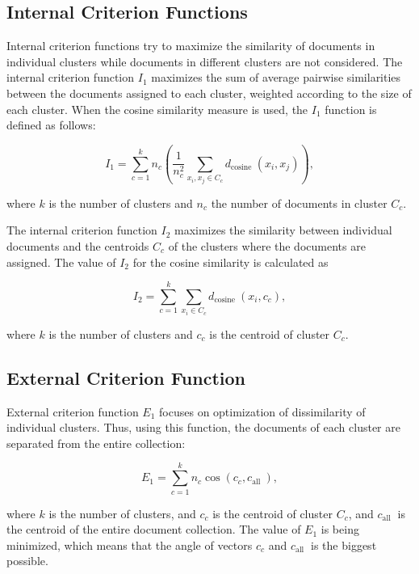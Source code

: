 \subsection{Internal Criterion Functions}
Internal criterion functions try to maximize the similarity of documents in individual clusters while documents in different clusters are not considered. The internal criterion function $I_{1}$ maximizes the sum of average pairwise similarities between the documents assigned to each cluster, weighted according to the size of each cluster. When the cosine similarity measure is used, the $I_{1}$ function is defined as follows:


\begin{equation*}
I_{1}=\sum_{c=1}^{k} n_{c}\left(\frac{1}{n_{c}^{2}} \sum_{x_{i}, x_{j} \in C_{c}} d_{\text {cosine }}\left(x_{i}, x_{j}\right)\right), \tag{12.15}
\end{equation*}


where $k$ is the number of clusters and $n_{c}$ the number of documents in cluster $C_{c}$.

The internal criterion function $I_{2}$ maximizes the similarity between individual documents and the centroids $C_{c}$ of the clusters where the documents are assigned. The value of $I_{2}$ for the cosine similarity is calculated as


\begin{equation*}
I_{2}=\sum_{c=1}^{k} \sum_{x_{i} \in C_{c}} d_{\text {cosine }}\left(x_{i}, c_{c}\right), \tag{12.16}
\end{equation*}


where $k$ is the number of clusters and $c_{c}$ is the centroid of cluster $C_{c}$.

\subsection{External Criterion Function}
External criterion function $E_{1}$ focuses on optimization of dissimilarity of individual clusters. Thus, using this function, the documents of each cluster are separated from the entire collection:


\begin{equation*}
E_{1}=\sum_{c=1}^{k} n_{c} \cos \left(c_{c}, c_{\text {all }}\right), \tag{12.17}
\end{equation*}


where $k$ is the number of clusters, and $c_{c}$ is the centroid of cluster $C_{c}$, and $c_{\text {all }}$ is the centroid of the entire document collection. The value of $E_{1}$ is being minimized, which means that the angle of vectors $c_{c}$ and $c_{\text {all }}$ is the biggest possible.

